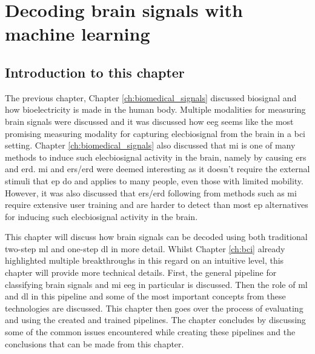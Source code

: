 

\glsresetall

\chapter{Decoding brain signals with machine learning}
\label{ch:processing_signals}

\section{Introduction to this chapter}
\label{sec:processing_signals_introduction}

The previous chapter, Chapter \ref{ch:biomedical_signals} discussed \gls{biosignal} and how bioelectricity is made in the human body.
Multiple modalities for measuring brain signals were discussed and it was discussed how \gls{eeg} seems like the most promising measuring modality for capturing \gls{elecbiosignal} from the brain in a \gls{bci} setting.
Chapter \ref{ch:biomedical_signals} also discussed that \gls{mi} is one of many methods to induce such \gls{elecbiosignal} activity in the brain, namely by causing \gls{ers} and \gls{erd}.
\gls{mi} and \gls{ers}/\gls{erd} were deemed interesting as it doesn't require the external stimuli that \gls{ep} do and applies to many people, even those with limited mobility.
However, it was also discussed that \gls{ers}/\gls{erd} following from methods such as \gls{mi} require extensive user training and are harder to detect than most \gls{ep} alternatives for inducing such \gls{elecbiosignal} activity in the brain.

This chapter will discuss how brain signals can be decoded using both traditional two-step \gls{ml} and one-step \gls{dl} in more detail.
Whilst Chapter \ref{ch:bci} already highlighted multiple breakthroughs in this regard on an intuitive level, this chapter will provide more technical details.
First, the general pipeline for classifying brain signals and \gls{mi} \gls{eeg} in particular is discussed.
Then the role of \gls{ml} and \gls{dl} in this pipeline and some of the most important concepts from these technologies are discussed.
This chapter then goes over the process of evaluating and using the created and trained pipelines.
The chapter concludes by discussing some of the common issues encountered while creating these pipelines and the conclusions that can be made from this chapter.


